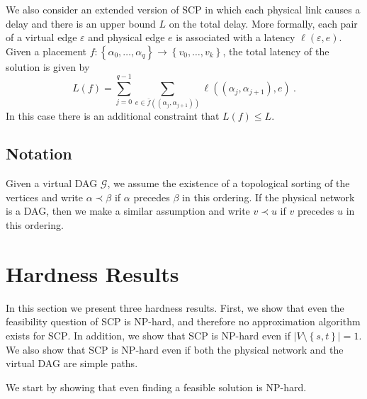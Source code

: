 \documentclass[11pt]{article}
\newcommand{\eqdf}{\stackrel{\scriptscriptstyle \triangle}{=}}
\newcommand{\set}[1]{\left\{ #1 \right\}}
\newcommand{\abs}[1]{\left| #1 \right|}
\newcommand{\eps}{\varepsilon}
\newcommand{\scp}{\textsc{SCP}\xspace}
\newcommand{\calE}{\mathcal{E}}
\newcommand{\calG}{\mathcal{G}}
\newcommand{\calV}{\mathcal{V}}
\begin{document}

We also consider an extended version of \scp in which each physical
link causes a delay and there is an upper bound $L$ on the total
delay.  More formally, each pair of a virtual edge $\eps$ and physical
edge $e$ is associated with a latency $\ell(\eps,e)$.
%
Given a placement $f: \set{\alpha_0,\ldots,\alpha_q} \to
\set{v_0,\ldots,v_k}$, the total latency of the solution is given by
\[
L(f)
= \sum_{j=0}^{q-1} \sum_{e \in \bar{f}((\alpha_j,\alpha_{j+1}))} \ell((\alpha_j,\alpha_{j+1}),e)
~.
\]
In this case there is an additional constraint that $L(f) \leq L$.



%

\subsection{Notation}
%
Given a virtual DAG $\calG$, we assume the existence of a topological
sorting of the vertices and write $\alpha \prec \beta$ if $\alpha$
precedes $\beta$ in this ordering.  If the physical network is a DAG,
then we make a similar assumption and write $v \prec u$ if $v$
precedes $u$ in this ordering.



\section{Hardness Results}

In this section we present three hardness results.  First, we show
that even the feasibility question of \scp is NP-hard, and therefore
no approximation algorithm exists for \scp.  In addition, we show that
\scp is NP-hard even if $\abs{V \setminus \set{s,t}} = 1$.  We also
show that \scp is NP-hard even if both the physical network and the
virtual DAG are simple paths.

We start by showing that even finding a feasible solution is NP-hard.
\end{document}
